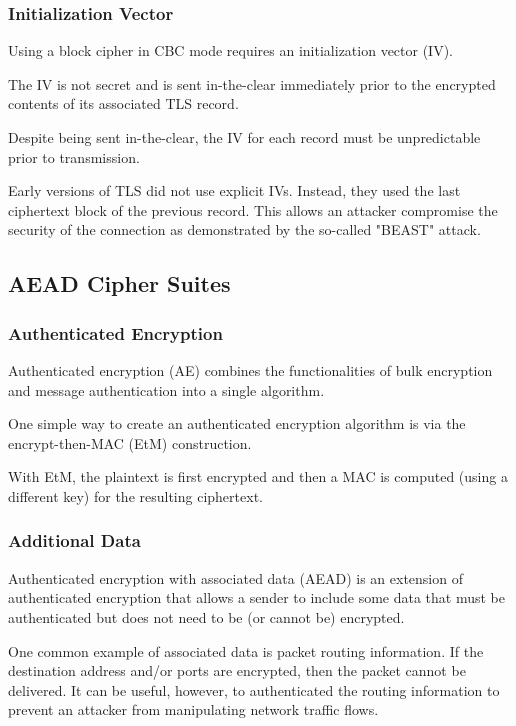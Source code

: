 \documentclass[aspectratio=169]{beamer}
\begin{document}
\begin{frame}[triangle=siiblue]
	\frametitle{Initialization Vector}
	Using a block cipher in CBC mode requires an initialization vector (IV).
	
	\vfill
	
	The IV is not secret and is sent in-the-clear immediately prior to the encrypted contents of its associated TLS record.
	
	\vfill
	
	Despite being sent in-the-clear, the IV for each record must be unpredictable prior to transmission.
	
	\vfill
	
	Early versions of TLS did not use explicit IVs. Instead, they used the last ciphertext block of the previous record. This allows an attacker compromise the security of the connection as demonstrated by  the so-called "BEAST" attack.

\end{frame}
\subsection{AEAD Cipher Suites}
\begin{frame}[triangle=siiblue]
	\frametitle{Authenticated Encryption}
	Authenticated encryption (AE) combines the functionalities of bulk encryption and message authentication into a single algorithm.
	
	\vfill
	
	One simple way to create an authenticated encryption algorithm is via the encrypt-then-MAC (EtM) construction.
	
	\vfill
	
	With EtM, the plaintext is first encrypted and then a MAC is computed (using a different key) for the resulting ciphertext. 
	
\end{frame}

\begin{frame}[triangle=siiblue]
	\frametitle{Additional Data}
	Authenticated encryption with associated data (AEAD) is an extension of authenticated encryption that allows a sender to include some data that must be authenticated but does not need to be (or cannot be) encrypted.
	
	\vfill
	
	One common example of associated data is packet routing information.  If the destination address and/or ports are encrypted, then the packet cannot be delivered.  It can be useful, however, to authenticated the routing information to prevent an attacker from manipulating network traffic flows.
\end{frame}
\end{document}
